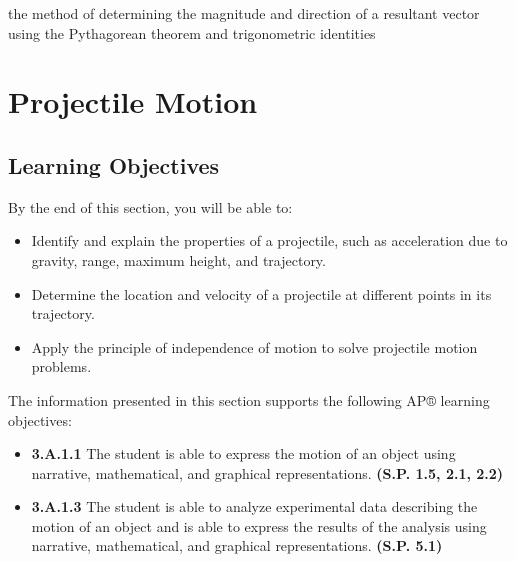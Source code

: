 \documentclass[
]{book}
\providecommand{\tightlist}{%
  \setlength{\itemsep}{0pt}\setlength{\parskip}{0pt}}
\newenvironment{learning-objectives}{}{}
\begin{document}
\begin{description}
\tightlist
\item[analytical method]
the method of determining the magnitude and direction of a resultant
vector using the Pythagorean theorem and trigonometric identities
\end{description}

\hypertarget{projectile-motion}{%
\section{Projectile Motion}\label{projectile-motion}}

\hypertarget{fs-id1563341}{}
\begin{learning-objectives}

\hypertarget{learning-objectives-10}{%
\subsection{Learning Objectives}\label{learning-objectives-10}}

By the end of this section, you will be able to:

\begin{itemize}
\tightlist
\item
  Identify and explain the properties of a projectile, such as
  acceleration due to gravity, range, maximum height, and trajectory.
\item
  Determine the location and velocity of a projectile at different
  points in its trajectory.
\item
  Apply the principle of independence of motion to solve projectile
  motion problems.
\end{itemize}

The information presented in this section supports the following AP®
learning objectives:

\begin{itemize}
\tightlist
\item
  \textbf{3.A.1.1} The student is able to express the motion of an object
  using narrative, mathematical, and graphical representations.
  \textbf{(S.P. 1.5, 2.1, 2.2)}
\item
  \textbf{3.A.1.3} The student is able to analyze experimental data
  describing the motion of an object and is able to express the
  results of the analysis using narrative, mathematical, and graphical
  representations. \textbf{(S.P. 5.1)}
\end{itemize}

\end{learning-objectives}
\end{document}
